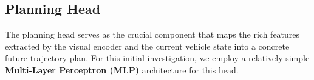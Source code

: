 \documentclass{article}
\begin{document}

\subsection{Planning Head}
\label{subsec:head}
The planning head serves as the crucial component that maps the rich features extracted by the visual encoder and the current vehicle state into a concrete future trajectory plan. For this initial investigation, we employ a relatively simple \textbf{Multi-Layer Perceptron (MLP)} architecture for this head.
\end{document}
